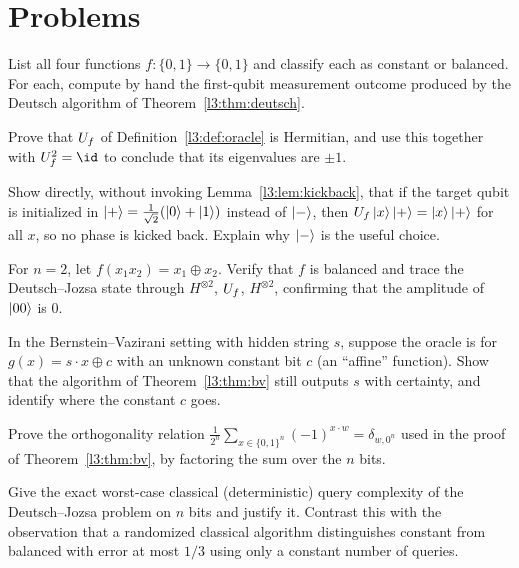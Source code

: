 \section{Problems}

\begin{exercise}
\label{l3:ex:p1}
List all four functions $f:\{0,1\}\to\{0,1\}$ and classify each as constant or
balanced. For each, compute by hand the first-qubit measurement outcome produced
by the Deutsch algorithm of Theorem~\ref{l3:thm:deutsch}.
\end{exercise}

\begin{exercise}
\label{l3:ex:p2}
Prove that $U_f$ of Definition~\ref{l3:def:oracle} is Hermitian, and use this together
with $\Uf^2=\id$ to conclude that its eigenvalues are $\pm1$.
\end{exercise}

\begin{exercise}
\label{l3:ex:p3}
Show directly, without invoking Lemma~\ref{l3:lem:kickback}, that if the target qubit
is initialized in $\ket{+}=\tfrac{1}{\sqrt2}(\ket0+\ket1)$ instead of $\ket{-}$,
then $U_f\ket{x}\ket{+}=\ket{x}\ket{+}$ for all $x$, so no phase is kicked back.
Explain why $\ket{-}$ is the useful choice.
\end{exercise}

\begin{exercise}
\label{l3:ex:p4}
For $n=2$, let $f(x_1x_2)=x_1\oplus x_2$. Verify that $f$ is balanced and trace the
Deutsch--Jozsa state through $H^{\otimes 2}$, $U_f$, $H^{\otimes 2}$, confirming
that the amplitude of $\ket{00}$ is $0$.
\end{exercise}

\begin{exercise}
\label{l3:ex:p5}
In the Bernstein--Vazirani setting with hidden string $s$, suppose the oracle is
for $g(x)=s\cdot x\oplus c$ with an unknown constant bit $c$ (an ``affine''
function). Show that the algorithm of Theorem~\ref{l3:thm:bv} still outputs $s$ with
certainty, and identify where the constant $c$ goes.
\end{exercise}

\begin{exercise}
\label{l3:ex:p6}
Prove the orthogonality relation $\tfrac{1}{2^n}\sum_{x\in\{0,1\}^n}(-1)^{x\cdot w}
=\delta_{w,0^n}$ used in the proof of Theorem~\ref{l3:thm:bv}, by factoring the sum
over the $n$ bits.
\end{exercise}

\begin{exercise}
\label{l3:ex:p7}
Give the exact worst-case classical (deterministic) query complexity of the
Deutsch--Jozsa problem on $n$ bits and justify it. Contrast this with the
observation that a randomized classical algorithm distinguishes constant from
balanced with error at most $1/3$ using only a constant number of queries.
\end{exercise}

